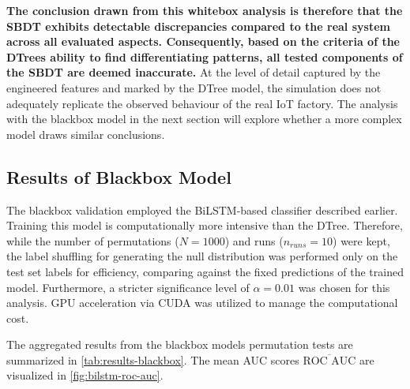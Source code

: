\textbf{The conclusion drawn from this whitebox analysis is therefore that the SBDT exhibits detectable discrepancies compared to the real system across all evaluated aspects. Consequently, based on the criteria of the DTrees ability to find differentiating patterns, all tested components of the SBDT are deemed inaccurate.} At the level of detail captured by the engineered features and marked by the DTree model, the simulation does not adequately replicate the observed behaviour of the real IoT factory. The analysis with the blackbox model in the next section will explore whether a more complex model draws similar conclusions.

\subsection*{Results of Blackbox Model}

The blackbox validation employed the BiLSTM-based classifier described earlier. Training this model is computationally more intensive than the DTree. Therefore, while the number of permutations ($N=1000$) and runs ($n_{runs}=10$) were kept, the label shuffling for generating the null distribution was performed only on the test set labels for efficiency, comparing against the fixed predictions of the trained model. Furthermore, a stricter significance level of $\alpha = 0.01$ was chosen for this analysis. GPU acceleration via CUDA \autocite{NVIDIA_CUDA} was utilized to manage the computational cost.

The aggregated results from the blackbox models permutation tests are summarized in \autoref{tab:results-blackbox}. The mean AUC scores $\overline{\text{ROC AUC}}$ are visualized in \autoref{fig:bilstm-roc-auc}.

